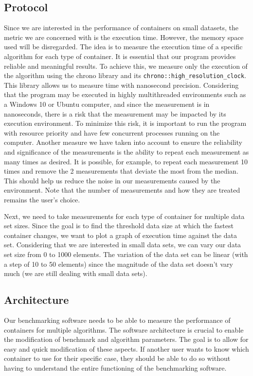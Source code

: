\documentclass[conference]{IEEEtran} \IEEEoverridecommandlockouts
\def\code#1{\texttt{#1}}
\begin{document}
\subsection{Protocol}

Since we are interested in the performance of containers on small
datasets, the metric we are concerned with is the execution
time. However, the memory space used will be disregarded. The idea is
to measure the execution time of a specific algorithm for each type of
container. It is essential that our program provides reliable and
meaningful results. To achieve this, we measure only the execution of
the algorithm using the chrono library and its
\code{chrono::high\_resolution\_clock}. This library allows us to
measure time with nanosecond precision. Considering that the program
may be executed in highly multithreaded environments such as a Windows
10 or Ubuntu computer, and since the measurement is in nanoseconds,
there is a risk that the measurement may be impacted by its execution
environment. To minimize this risk, it is important to run the program
with resource priority and have few concurrent processes running on
the computer. Another measure we have taken into account to ensure the
reliability and significance of the measurements is the ability to
repeat each measurement as many times as desired. It is possible, for
example, to repeat each measurement 10 times and remove the 2
measurements that deviate the most from the median. This should help
us reduce the noise in our measurements caused by the
environment. Note that the number of measurements and how they are
treated remains the user's choice.

Next, we need to take measurements for each type of container for
multiple data set sizes. Since the goal is to find the threshold data
size at which the fastest container changes, we want to plot a graph
of execution time against the data set. Considering that we are
interested in small data sets, we can vary our data set size from 0 to
1000 elements. The variation of the data set can be linear (with a
step of 10 to 50 elements) since the magnitude of the data set doesn't
vary much (we are still dealing with small data sets).

\subsection{Architecture}

Our benchmarking software needs to be able to measure the performance
of containers for multiple algorithms. The software architecture is
crucial to enable the modification of benchmark and algorithm
parameters. The goal is to allow for easy and quick modification of
these aspects. If another user wants to know which container to use
for their specific case, they should be able to do so without having
to understand the entire functioning of the benchmarking software.
\end{document}
